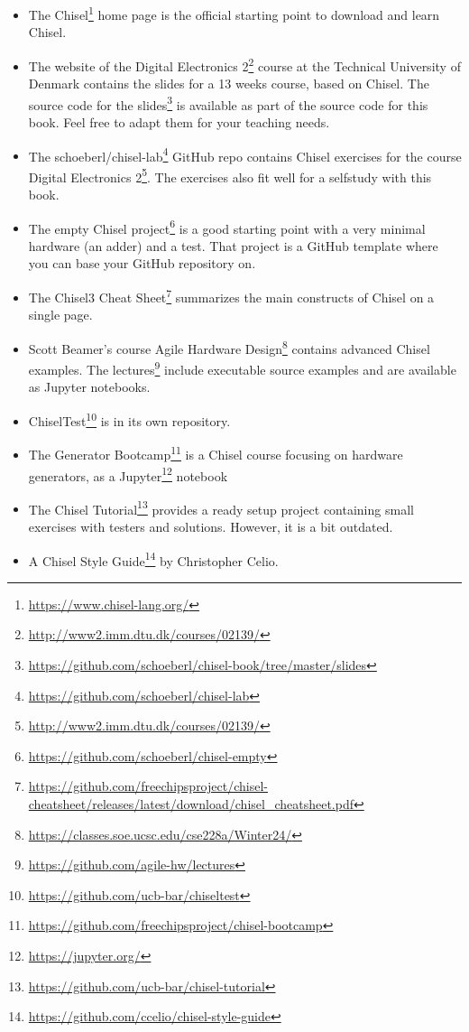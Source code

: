 \documentclass[%
    10pt,
    headinclude, footexclude,
    openright, %
    notitlepage,
    cleardoubleempty,
    headsepline,
    pointlessnumbers,
    bibtotoc, idxtotoc,
    ]{scrbook}
\newcommand{\myref}[2]{\href{#1}{#2}}
\renewcommand{\myref}[2]{{#2}{\footnote{\url{#1}}}}
\begin{document}
\begin{itemize}
\item The \myref{https://www.chisel-lang.org/}{Chisel} home page is the official starting point to
download and learn Chisel.
\item The website of the \myref{http://www2.imm.dtu.dk/courses/02139/}{Digital Electronics 2} course
at the Technical University of Denmark contains the slides for a 13 weeks course, based on Chisel.
The source code for the \myref{https://github.com/schoeberl/chisel-book/tree/master/slides}{slides}
is available as part of the source code for this book. Feel free to adapt them for your teaching needs.
\item The \myref{https://github.com/schoeberl/chisel-lab}{schoeberl/chisel-lab} GitHub repo
contains Chisel exercises for the course \myref{http://www2.imm.dtu.dk/courses/02139/}{Digital Electronics 2}.
The exercises also fit well for a selfstudy with this book.
\item The \myref{https://github.com/schoeberl/chisel-empty}{empty Chisel project} is a good starting
point with a very minimal hardware (an adder) and a test. That project is a GitHub template where you
can base your GitHub repository on.
\item The \myref{https://github.com/freechipsproject/chisel-cheatsheet/releases/latest/download/chisel_cheatsheet.pdf}{Chisel3 Cheat Sheet} summarizes the main constructs of Chisel on a single page.
\item Scott Beamer's course \myref{https://classes.soe.ucsc.edu/cse228a/Winter24/}{Agile Hardware Design}
contains advanced Chisel examples. The \myref{https://github.com/agile-hw/lectures}{lectures}
include executable source examples and are available as Jupyter notebooks.
\item \myref{https://github.com/ucb-bar/chiseltest}{ChiselTest} is in
its own repository.
\item The \myref{https://github.com/freechipsproject/chisel-bootcamp}{Generator Bootcamp} is
a Chisel course focusing on hardware generators, as a \myref{https://jupyter.org/}{Jupyter} notebook
\item The \myref{https://github.com/ucb-bar/chisel-tutorial}{Chisel Tutorial} provides a ready setup
project containing small exercises with testers and solutions. However, it is a bit outdated.
\item A \myref{https://github.com/ccelio/chisel-style-guide}{Chisel Style Guide} by Christopher Celio.

\end{itemize}
\end{document}
